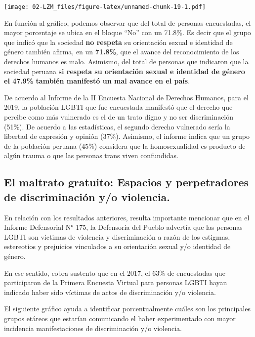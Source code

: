 \documentclass[
]{book}
\theoremstyle{definition}
\theoremstyle{definition}
\theoremstyle{definition}
\theoremstyle{definition}
\theoremstyle{remark}
\begin{document}
\texttt{[image: 02-LZM\_files/figure-latex/unnamed-chunk-19-1.pdf]}

En función al gráfico, podemos observar que del total de personas encuestadas, el mayor porcentaje se ubica en el bloque ``No'' con un 71.8\%. Es decir que el grupo que indicó que la sociedad \textbf{no respeta} su orientación sexual e identidad de género también afirma, en un \textbf{71.8\%}, que el avance del reconocimiento de los derechos humanos es malo. Asimismo, del total de personas que indicaron que la sociedad peruana \textbf{si respeta su orientación sexual e identidad de género el 47.9\% también manifestó un mal avance en el país}.

De acuerdo al Informe de la II Encuesta Nacional de Derechos Humanos, para el 2019, la población LGBTI que fue encuestada manifestó que el derecho que percibe como más vulnerado es el de un trato digno y no ser discriminación (51\%). De acuerdo a las estadísticas, el segundo derecho vulnerado sería la libertad de expresión y opinión (37\%). Asimismo, el informe indica que un grupo de la población peruana (45\%) considera que la homosexualidad es producto de algún trauma o que las personas trans viven confundidas.

\hypertarget{el-maltrato-gratuito-espacios-y-perpetradores-de-discriminaciuxf3n-yo-violencia.}{%
\subsection{El maltrato gratuito: Espacios y perpetradores de discriminación y/o violencia.}\label{el-maltrato-gratuito-espacios-y-perpetradores-de-discriminaciuxf3n-yo-violencia.}}

En relación con los resultados anteriores, resulta importante mencionar que en el Informe Defensorial N° 175, la Defensoría del Pueblo advertía que las personas LGBTI son víctimas de violencia y discriminación a razón de los estigmas, estereotios y prejuicios vinculados a su orientación sexual y/o identidad de género.

En ese sentido, cobra sustento que en el 2017, el 63\% de encuestadas que participaron de la Primera Encuesta Virtual para personas LGBTI hayan indicado haber sido víctimas de actos de discriminación y/o violencia.

El siguiente gráfico ayuda a identificar porcentualmente cuáles son los principales grupos etáreos que estarían comunicando el haber experimentado con mayor incidencia manifestaciones de discriminación y/o violencia.
\end{document}
